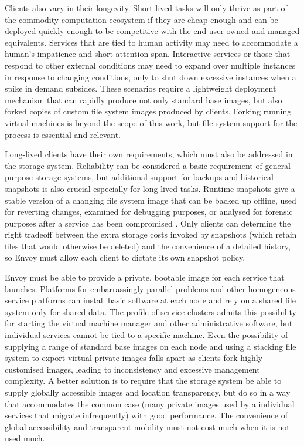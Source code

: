 Clients also vary in their longevity. Short-lived tasks will only thrive as part of the commodity computation ecosystem if they are cheap enough and can be deployed quickly enough to be competitive with the end-user owned and managed equivalents. Services that are tied to human activity may need to accommodate a human's impatience and short attention span. Interactive services or those that respond to other external conditions may need to expand over multiple instances in response to changing conditions, only to shut down excessive instances when a spike in demand subsides. These scenarios require a lightweight deployment mechanism that can rapidly produce not only standard base images, but also forked copies of custom file system images produced by clients. Forking running virtual machines is beyond the scope of this work, but file system support for the process is essential and relevant.

Long-lived clients have their own requirements, which must also be addressed in the storage system. Reliability can be considered a basic requirement of general-purpose storage systems, but additional support for backups and historical snapshots is also crucial especially for long-lived tasks. Runtime snapshots give a stable version of a changing file system image that can be backed up offline, used for reverting changes, examined for debugging purposes, or analysed for forensic purposes after a service has been compromised \cite{king,whitaker04}. Only clients can determine the right tradeoff between the extra storage costs invoked by snapshots (which retain files that would otherwise be deleted) and the convenience of a detailed history, so Envoy must allow each client to dictate its own snapshot policy.

Envoy must be able to provide a private, bootable image for each service that launches. Platforms for embarrassingly parallel problems and other homogeneous service platforms can install basic software at each node and rely on a shared file system only for shared data. The profile of service clusters admits this possibility for starting the virtual machine manager and other administrative software, but individual services cannot be tied to a specific machine. Even the possibility of supplying a range of standard base images on each node and using a stacking file system to export virtual private images falls apart as clients fork highly-customised images, leading to inconsistency and excessive management complexity. A better solution is to require that the storage system be able to supply globally accessible images and location transparency, but do so in a way that accommodates the common case (many private images used by a individual services that migrate infrequently) with good performance. The convenience of global accessibility and transparent mobility must not cost much when it is not used much.

